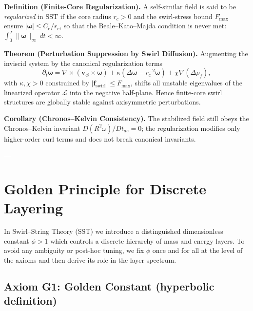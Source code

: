 \documentclass[10pt,reprint,aps,onecolumn,nofootinbib]{revtex4-2}
\begin{document}
    \textbf{Definition (Finite-Core Regularization).}
    A self-similar field is said to be \emph{regularized} in SST if the core radius
    \(r_c>0\) and the swirl-stress bound \(F_{\max}\) ensure
    \(|\boldsymbol{\omega}| \le C_e/r_c\),
    so that the Beale–Kato–Majda condition is never met:
    \(\displaystyle \int_0^T \|\boldsymbol{\omega}\|_{\infty}\,dt < \infty.\)

    \textbf{Theorem (Perturbation Suppression by Swirl Diffusion).}
    Augmenting the inviscid system by the canonical regularization terms
    \begin{equation}
        \partial_t\boldsymbol{\omega}
        = \nabla\times(\mathbf{v}_{\!\boldsymbol{\circlearrowleft}}\!\times\!\boldsymbol{\omega})
        +\kappa(\Delta\boldsymbol{\omega}-r_c^{-2}\boldsymbol{\omega})
        +\chi\nabla(\Delta\rho_{\!f}),
    \end{equation}
    with $\kappa,\chi>0$ constrained by $|\mathbf{f}_{\text{swirl}}|\!\le\! F_{\max}$,
    shifts all unstable eigenvalues of the linearized operator
    $\mathcal{L}$ into the negative half-plane.
    Hence finite-core swirl structures are globally stable against axisymmetric perturbations.

    \textbf{Corollary (Chronos–Kelvin Consistency).}
    The stabilized field still obeys the Chronos–Kelvin invariant
    \(\displaystyle D(R^2\omega)/Dt_{\!ae}=0\);
    the regularization modifies only higher-order curl terms and does not break canonical invariants.

    ---


    \section{Golden Principle for Discrete Layering}
    \label{sec:golden-principle}

    In Swirl--String Theory (SST) we introduce a distinguished
    dimensionless constant $\phi>1$ which controls a discrete hierarchy of
    mass and energy layers. To avoid any ambiguity or post-hoc tuning, we
    fix $\phi$ once and for all at the level of the axioms and then derive
    its role in the layer spectrum.

    \subsection{Axiom G1: Golden Constant (hyperbolic definition)}
\end{document}
